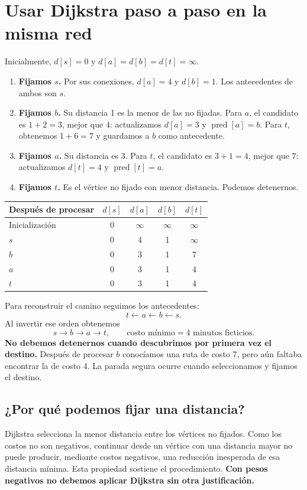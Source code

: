 \documentclass[11pt,letterpaper]{article}
\begin{document}
\section{Usar Dijkstra paso a paso en la misma red}
Inicialmente, $d[s]=0$ y $d[a]=d[b]=d[t]=\infty$.
\begin{enumerate}
\item \textbf{Fijamos $s$.} Por sus conexiones, $d[a]=4$ y $d[b]=1$. Los antecedentes de ambos son $s$.
\item \textbf{Fijamos $b$.} Su distancia 1 es la menor de las no fijadas. Para $a$, el candidato es $1+2=3$, mejor que 4: actualizamos $d[a]=3$ y $\operatorname{pred}[a]=b$. Para $t$, obtenemos $1+6=7$ y guardamos a $b$ como antecedente.
\item \textbf{Fijamos $a$.} Su distancia es 3. Para $t$, el candidato es $3+1=4$, mejor que 7: actualizamos $d[t]=4$ y $\operatorname{pred}[t]=a$.
\item \textbf{Fijamos $t$.} Es el vértice no fijado con menor distancia. Podemos detenernos.
\end{enumerate}
\begin{center}
\begin{tabular}{lcccc}
\toprule
Después de procesar & $d[s]$ & $d[a]$ & $d[b]$ & $d[t]$\\
\midrule
Inicialización & 0 & $\infty$ & $\infty$ & $\infty$\\
$s$ & 0 & 4 & 1 & $\infty$\\
$b$ & 0 & 3 & 1 & 7\\
$a$ & 0 & 3 & 1 & 4\\
$t$ & 0 & 3 & 1 & 4\\
\bottomrule
\end{tabular}
\end{center}
Para reconstruir el camino seguimos los antecedentes:
\[
t\leftarrow a\leftarrow b\leftarrow s.
\]
Al invertir ese orden obtenemos
\[
\boxed{s\to b\to a\to t,\qquad \text{costo mínimo}=4\text{ minutos ficticios}.}
\]
\textbf{No debemos detenernos cuando descubrimos por primera vez el destino.} Después de procesar $b$ conocíamos una ruta de costo 7, pero aún faltaba encontrar la de costo 4. La parada segura ocurre cuando seleccionamos y fijamos el destino.

\subsection{¿Por qué podemos fijar una distancia?}
Dijkstra selecciona la menor distancia entre los vértices no fijados. Como los costos no son negativos, continuar desde un vértice con una distancia mayor no puede producir, mediante costos negativos, una reducción inesperada de esa distancia mínima. Esta propiedad sostiene el procedimiento. \textbf{Con pesos negativos no debemos aplicar Dijkstra sin otra justificación.}
\end{document}
